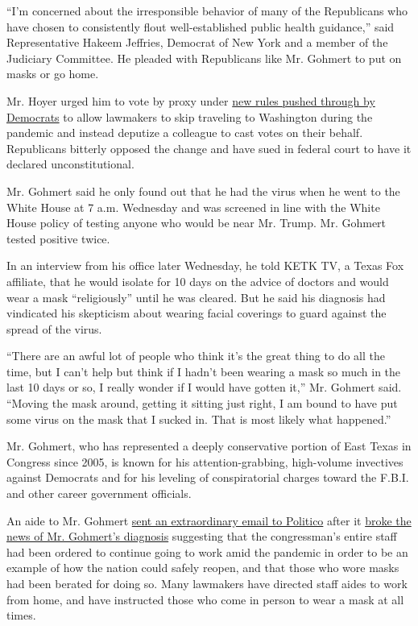 ``I'm concerned about the irresponsible behavior of many of the
Republicans who have chosen to consistently flout well-established
public health guidance,'' said Representative Hakeem Jeffries, Democrat
of New York and a member of the Judiciary Committee. He pleaded with
Republicans like Mr. Gohmert to put on masks or go home.

Mr. Hoyer urged him to vote by proxy under
\href{https://www.nytimes3xbfgragh.onion/2020/05/15/us/politics/remote-voting-house-coronavirus.html}{new
rules pushed through by Democrats} to allow lawmakers to skip traveling
to Washington during the pandemic and instead deputize a colleague to
cast votes on their behalf. Republicans bitterly opposed the change and
have sued in federal court to have it declared unconstitutional.

Mr. Gohmert said he only found out that he had the virus when he went to
the White House at 7 a.m. Wednesday and was screened in line with the
White House policy of testing anyone who would be near Mr. Trump. Mr.
Gohmert tested positive twice.

In an interview from his office later Wednesday, he told KETK TV, a
Texas Fox affiliate, that he would isolate for 10 days on the advice of
doctors and would wear a mask ``religiously'' until he was cleared. But
he said his diagnosis had vindicated his skepticism about wearing facial
coverings to guard against the spread of the virus.

``There are an awful lot of people who think it's the great thing to do
all the time, but I can't help but think if I hadn't been wearing a mask
so much in the last 10 days or so, I really wonder if I would have
gotten it,'' Mr. Gohmert said. ``Moving the mask around, getting it
sitting just right, I am bound to have put some virus on the mask that I
sucked in. That is most likely what happened.''

Mr. Gohmert, who has represented a deeply conservative portion of East
Texas in Congress since 2005, is known for his attention-grabbing,
high-volume invectives against Democrats and for his leveling of
conspiratorial charges toward the F.B.I. and other career government
officials.

An aide to Mr. Gohmert
\href{https://twitter.com/JakeSherman/status/1288524502649966592?s=20}{sent
an extraordinary email to Politico} after it
\href{https://www.politico.com/news/2020/07/29/louis-gohmert-who-refused-to-wear-a-mask-tests-positive-for-coronavirus-386076}{broke
the news of Mr. Gohmert's diagnosis} suggesting that the congressman's
entire staff had been ordered to continue going to work amid the
pandemic in order to be an example of how the nation could safely
reopen, and that those who wore masks had been berated for doing so.
Many lawmakers have directed staff aides to work from home, and have
instructed those who come in person to wear a mask at all times.

